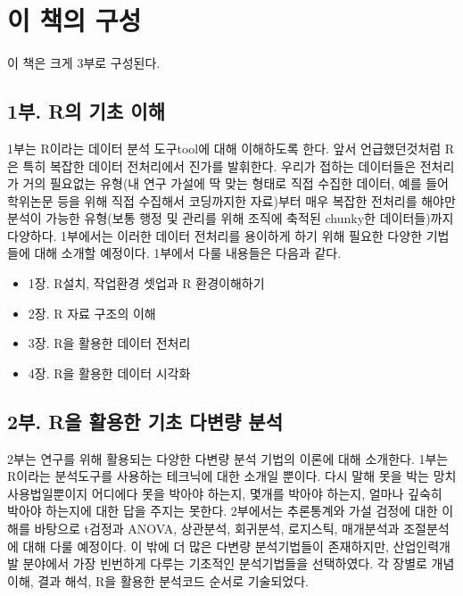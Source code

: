 \documentclass[
]{book}
\providecommand{\tightlist}{%
  \setlength{\itemsep}{0pt}\setlength{\parskip}{0pt}}
\theoremstyle{definition}
\theoremstyle{definition}
\theoremstyle{definition}
\theoremstyle{definition}
\theoremstyle{remark}
\begin{document}
\hypertarget{uxc774-uxcc45uxc758-uxad6cuxc131}{%
\section{이 책의 구성}\label{uxc774-uxcc45uxc758-uxad6cuxc131}}

이 책은 크게 3부로 구성된다.

\hypertarget{uxbd80.-ruxc758-uxae30uxcd08-uxc774uxd574}{%
\subsection*{1부. R의 기초 이해}\label{uxbd80.-ruxc758-uxae30uxcd08-uxc774uxd574}}

1부는 R이라는 데이터 분석 도구tool에 대해 이해하도록 한다. 앞서 언급했던것처럼 R은 특히 복잡한 데이터 전처리에서 진가를 발휘한다. 우리가 접하는 데이터들은 전처리가 거의 필요없는 유형(내 연구 가설에 딱 맞는 형태로 직접 수집한 데이터, 예를 들어 학위논문 등을 위해 직접 수집해서 코딩까지한 자료)부터 매우 복잡한 전처리를 해야만 분석이 가능한 유형(보통 행정 및 관리를 위해 조직에 축적된 chunky한 데이터들)까지 다양하다. 1부에서는 이러한 데이터 전처리를 용이하게 하기 위해 필요한 다양한 기법들에 대해 소개할 예정이다. 1부에서 다룰 내용들은 다음과 같다.

\begin{itemize}
\tightlist
\item
  1장. R설치, 작업환경 셋업과 R 환경이해하기
\item
  2장. R 자료 구조의 이해
\item
  3장. R을 활용한 데이터 전처리
\item
  4장. R을 활용한 데이터 시각화
\end{itemize}

\hypertarget{uxbd80.-ruxc744-uxd65cuxc6a9uxd55c-uxae30uxcd08-uxb2e4uxbcc0uxb7c9-uxbd84uxc11d}{%
\subsection*{2부. R을 활용한 기초 다변량 분석}\label{uxbd80.-ruxc744-uxd65cuxc6a9uxd55c-uxae30uxcd08-uxb2e4uxbcc0uxb7c9-uxbd84uxc11d}}

2부는 연구를 위해 활용되는 다양한 다변량 분석 기법의 이론에 대해 소개한다. 1부는 R이라는 분석도구를 사용하는 테크닉에 대한 소개일 뿐이다. 다시 말해 못을 박는 망치 사용법일뿐이지 어디에다 못을 박아야 하는지, 몇개를 박아야 하는지, 얼마나 깊숙히 박아야 하는지에 대한 답을 주지는 못한다. 2부에서는 추론통계와 가설 검정에 대한 이해를 바탕으로 t검정과 ANOVA, 상관분석, 회귀분석, 로지스틱, 매개분석과 조절분석에 대해 다룰 예정이다. 이 밖에 더 많은 다변량 분석기법들이 존재하지만, 산업인력개발 분야에서 가장 빈번하게 다루는 기초적인 분석기법들을 선택하였다. 각 장별로 개념이해, 결과 해석, R을 활용한 분석코드 순서로 기술되었다.
\end{document}
